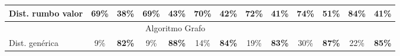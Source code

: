\documentclass[12pt,a4paper]{article}
\begin{document}
\begin{table}[H]
{\begin{tabular}{l|cc|cc|cc|cc|cc|cc|}
\rowcolor[rgb]{0.925,0.957,1} Dist. rumbo valor                                                                                                                                               & \textcolor[rgb]{0,0.502,0}{69\%}                   & 38\%                                               & \textcolor[rgb]{0,0.502,0}{69\%}                   & 43\%                                               & \textcolor[rgb]{0,0.502,0}{70\%}                   & 42\%                                               & \textcolor[rgb]{0,0.502,0}{72\%}                   & 41\%                                               & \textcolor[rgb]{0,0.502,0}{74\%}                   & 51\%                                               & \textcolor[rgb]{0,0.502,0}{84\%}                   & 41\%                                                \\ 
\hline
\multicolumn{13}{c}{{\cellcolor[rgb]{0.796,0.808,0.984}}Algoritmo Grafo~ ~ ~ ~ ~ ~ ~~}                                                                                                                                                                                                                                                                                                                                                                                                                                                                                                                                                                                                                                                                                                                                                                     \\ 
\hline
\rowcolor[rgb]{0.925,0.957,1} Dist. genérica                                                                                                                                                  & 9\%                                                & \textbf{\textbf{\textcolor[rgb]{0,0.502,0}{82\%}}} & 9\%                                                & \textbf{\textbf{\textcolor[rgb]{0,0.502,0}{88\%}}} & 14\%                                               & \textbf{\textbf{\textcolor[rgb]{0,0.502,0}{84\%}}} & 19\%                                               & \textbf{\textbf{\textcolor[rgb]{0,0.502,0}{83\%}}} & 30\%                                               & \textbf{\textbf{\textcolor[rgb]{0,0.502,0}{87\%}}} & 22\%                                               & \textbf{\textbf{\textcolor[rgb]{0,0.502,0}{85\%}}}  \\

\end{tabular}}
\end{table}
\end{document}
